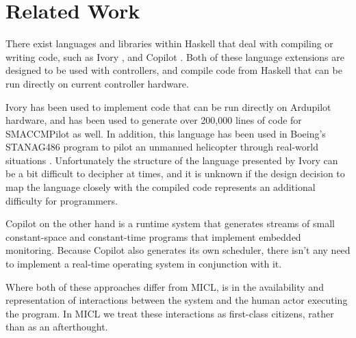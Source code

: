 \documentclass{sig-alternate-05-2015}
\begin{document}
\section{Related Work}
\label{sec:related}
There exist languages and libraries within Haskell that deal with compiling or
writing  code, such as Ivory \cite{elliot2015ivory}, and Copilot
\cite{pike2010copilot}. Both of these language extensions are designed to be
used with controllers, and compile  code from Haskell that can be
run directly on current controller hardware.

Ivory has been used to implement code that can be run directly on Ardupilot
hardware, and has been used to generate over 200,000 lines of code for
SMACCMPilot as well. In addition, this language has been used in Boeing's
STANAG486 program to pilot an unmanned helicopter through real-world
situations \cite{boeing2016auto}. Unfortunately the structure of the language
presented by Ivory can be a bit difficult to decipher at times, and it is
unknown if the design decision to map the language closely with the compiled
code represents an additional difficulty for programmers.

Copilot on the other hand is a runtime system that generates streams of small
constant-space and constant-time  programs that implement embedded
monitoring. Because Copilot also generates its own scheduler, there isn't any
need to implement a real-time operating system in conjunction with it.

Where both of these approaches differ from MICL, is in the availability and
representation of interactions between the system and the human actor
executing the program. In MICL we treat these interactions as first-class
citizens, rather than as an afterthought.




\end{document}
